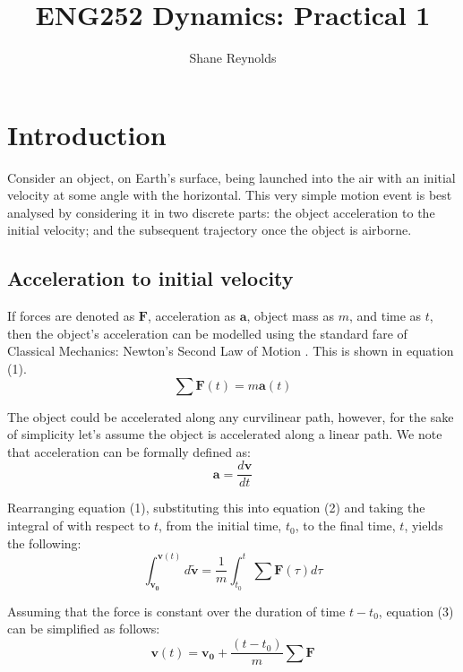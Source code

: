 \documentclass[a4paper]{article}
\begin{document}
\title{ENG252 Dynamics: Practical 1}
\author{Shane Reynolds}
\maketitle

\section{Introduction}
Consider an object, on Earth's surface, being launched into the air with an initial velocity at some angle with the horizontal. This very simple motion event is best analysed by considering it in two discrete parts: the object acceleration to the initial velocity; and the subsequent trajectory once the object is airborne.

\subsection{Acceleration to initial velocity}
If forces are denoted as $\boldsymbol{F}$, acceleration as $\boldsymbol{a}$, object mass as $m$, and time as $t$, then the object's acceleration can be modelled using the standard fare of Classical Mechanics: Newton's Second Law of Motion \cite{Giancoli:2000}. This is shown in equation (1).
\begin{equation}
\sum \boldsymbol{F}(t) = m \boldsymbol{a}(t)
\end{equation}

The object could be accelerated along any curvilinear path, however, for the sake of simplicity let's assume the object is accelerated along a linear path. We note that acceleration can be formally defined as:
\begin{equation}
\boldsymbol{a} = \frac{d\boldsymbol{v}}{dt}
\end{equation}

Rearranging equation (1), substituting this into equation (2) and taking the integral of with respect to $t$, from the initial time, $t_0$, to the final time, $t$, yields the following:
\begin{equation}
\int_{\boldsymbol{v_0}}^{\boldsymbol{v}(t)} d\tilde{\boldsymbol{v}} = \frac{1}{m}\int_{t_0}^{t} \sum \boldsymbol{F}(\tau) d\tau
\end{equation}

Assuming that the force is constant over the duration of time $t-t_0$, equation (3) can be simplified as follows:
\begin{equation}
\boldsymbol{v}(t) = \boldsymbol{v_0} + \frac{(t-t_0)}{m} \sum \boldsymbol{F} 
\end{equation}
\end{document}
